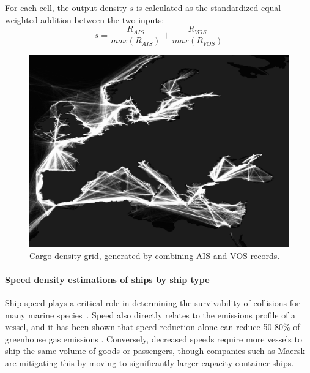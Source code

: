\documentclass[12pt,letterpaper]{article}
\begin{document}
For each cell, the output density $s$ is calculated as the standardized equal-weighted addition between the two inputs:
\begin{equation}
 s = \frac{R_{AIS}}{max(R_{AIS})} + \frac{R_{VOS}}{max(R_{VOS})} 
\end{equation}

\begin{figure}[h!]
  \centering
    \includegraphics[width=120mm]{figures/cargo-lanes-eu-cropped.png}
  \caption {Cargo density grid, generated by combining AIS and VOS records.}
  \label{fig:eu-cargo-density}
\end{figure}


\paragraph{Speed density estimations of ships by ship type}

Ship speed plays a critical role in determining the survivability of collisions for many marine species~\citep{Vanderlaan2009}. Speed also directly relates to the emissions profile of a vessel, and it has been shown that speed reduction alone can reduce 50-80\% of greenhouse gas emissions \cite{lack2011impact}. Conversely, decreased speeds require more vessels to ship the same volume of goods or passengers, though companies such as Maersk are mitigating this by moving to significantly larger capacity container ships. 
\end{document}
